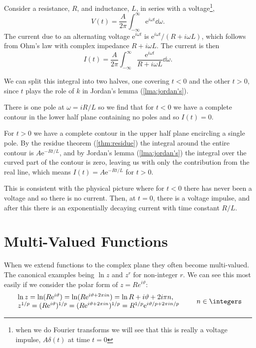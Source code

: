 \documentclass[fleqn]{NotesClass}
\newcommand*{\e}{\mathrm{e}}
\begin{document}
    \begin{exm}{}{}
        Consider a resistance, \(R\), and inductance, \(L\), in series with a voltage\footnote{when we do Fourier transforms we will see that this is really a voltage impulse, \(A\delta(t)\) at time \(t = 0\)},
        \begin{equation}
            V(t) = \frac{A}{2\pi} \int_{-\infty}^{\infty} \e^{i\omega t}\dd{\omega}.
        \end{equation}
        The current due to an alternating voltage \(\e^{i\omega t}\) is \(\e^{i\omega t}/(R + i\omega L)\), which follows from Ohm's law with complex impedance \(R + i\omega L\).
        The current is then
        \begin{equation}
            I(t) = \frac{A}{2\pi} \int_{-\infty}^{\infty} \frac{\e^{i\omega t}}{R + i\omega L}\dd{\omega}.
        \end{equation}
        
        We can split this integral into two halves, one covering \(t < 0\) and the other \(t > 0\), since \(t\) plays the role of \(k\) in Jordan's lemma (\cref{lma:jordan's}).
        
        There is one pole at \(\omega = iR/L\) so we find that for \(t < 0\) we have a complete contour in the lower half plane containing no poles and so \(I(t) = 0\).
        
        For \(t > 0\) we have a complete contour in the upper half plane encircling a single pole.
        By the residue theorem (\cref{thm:residue}) the integral around the entire contour is \(A\e^{-Rt/L}\), and by Jordan's lemma (\cref{lma:jordan's}) the integral over the curved part of the contour is zero, leaving us with only the contribution from the real line, which means \(I(t) = A\e^{-Rt/L}\) for \(t > 0\).
        
        This is consistent with the physical picture where for \(t < 0\) there has never been a voltage and so there is no current.
        Then, at \(t = 0\), there is a voltage impulse, and after this there is an exponentially decaying current with time constant \(R/L\).
    \end{exm}
    
    \section{Multi-Valued Functions}
    When we extend functions to the complex plane they often become multi-valued.
    The canonical examples being \(\ln z\) and \(z^r\) for non-integer \(r\).
    We can see this most easily if we consider the polar form of \(z = Re^{i\vartheta}\):
    \begin{equation}
        \begin{array}{l}
            \ln z = \ln(R\e^{i\vartheta}) = \ln(R\e^{i\vartheta + 2\pi in}) = \ln R + i\vartheta + 2i\pi n,\\
            z^{1/p} = (R\e^{i\vartheta})^{1/p} = (R\e^{i\vartheta + 2\pi i n})^{1/p} = R^{1/p}\e^{i\vartheta/p + 2\pi in/p}
        \end{array}
        \qquad n \in \integers
    \end{equation}
    
\end{document}
